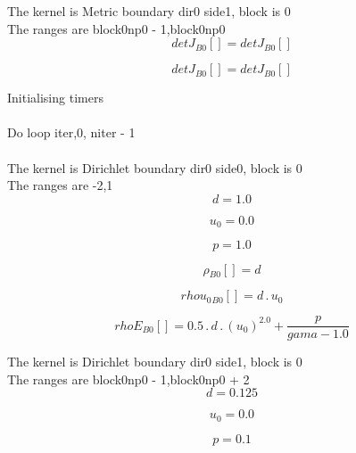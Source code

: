 \documentclass{article}
\begin{document}
\noindent The kernel is Metric boundary dir0 side1, block is 0\\\noindent The ranges are block0np0 - 1,block0np0\\\begin{dmath}{detJ{_{B0}}}[{}] = {detJ{_{B0}}}[{}]\end{dmath}

\begin{dmath}{detJ{_{B0}}}[{}] = {detJ{_{B0}}}[{}]\end{dmath}

\noindent Initialising timers\\
\\\noindent Do loop iter,0, niter - 1\\
\\\noindent The kernel is Dirichlet boundary dir0 side0, block is 0\\\noindent The ranges are -2,1\\\begin{dmath}d = 1.0\end{dmath}

\begin{dmath}u_{0} = 0.0\end{dmath}

\begin{dmath}p = 1.0\end{dmath}

\begin{dmath}{\rho{_{B0}}}[{}] = d\end{dmath}

\begin{dmath}{rhou_{0}{_{B0}}}[{}] = d \,.\, u_{0}\end{dmath}

\begin{dmath}{rhoE{_{B0}}}[{}] = 0.5 \,.\, d \,.\, \left(u_{0} \right)^{2.0} + \frac{p}{gama - 1.0}\end{dmath}

\noindent The kernel is Dirichlet boundary dir0 side1, block is 0\\\noindent The ranges are block0np0 - 1,block0np0 + 2\\\begin{dmath}d = 0.125\end{dmath}

\begin{dmath}u_{0} = 0.0\end{dmath}

\begin{dmath}p = 0.1\end{dmath}
\end{document}
